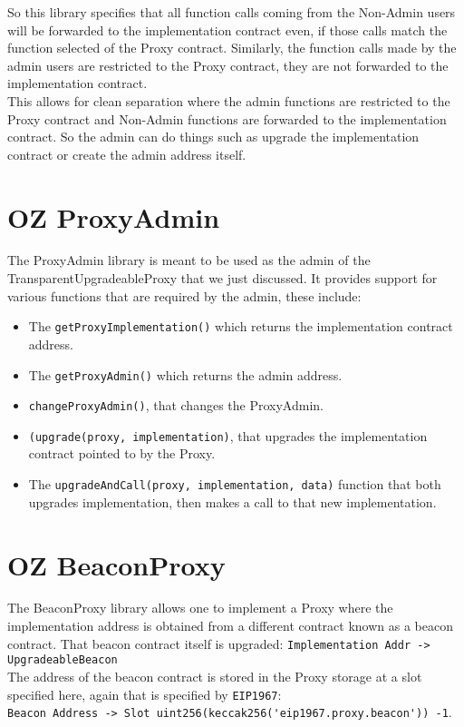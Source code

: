 So this library specifies that all function calls coming from the Non-Admin users will be forwarded to the implementation contract even, if those calls match the function selected of the Proxy contract. Similarly, the function calls made by the admin users are restricted to the Proxy contract, they are not forwarded to the implementation contract.\\

This allows for clean separation where the admin functions are restricted to the Proxy contract and Non-Admin functions are forwarded to the implementation contract. So the admin can do things such as upgrade the implementation contract or create the admin address itself.

\section{OZ ProxyAdmin}
The ProxyAdmin library is meant to be used as the admin of the TransparentUpgradeableProxy that we just discussed. It provides support for various functions that are required by the admin, these include:

\begin{itemize}
\item The \verb|getProxyImplementation()| which returns the implementation contract address. 
\item The \verb|getProxyAdmin()| which returns the admin address.
\item\verb|changeProxyAdmin()|, that changes the ProxyAdmin.
\item\verb|(upgrade(proxy, implementation)|, that upgrades the implementation contract pointed to by the Proxy.
\item The \verb|upgradeAndCall(proxy, implementation, data)| function that both upgrades implementation, then makes a call to that new implementation.
\end{itemize}

\section{OZ BeaconProxy}

The BeaconProxy library allows one to implement a Proxy where the implementation address is obtained from a different contract known as a beacon contract. That beacon contract itself is upgraded: \verb|Implementation Addr -> UpgradeableBeacon|\\

The address of the beacon contract is stored in the Proxy storage at a slot specified here, again that is specified by \verb|EIP1967|:\\\verb|Beacon Address -> Slot uint256(keccak256('eip1967.proxy.beacon')) -1|. \\

